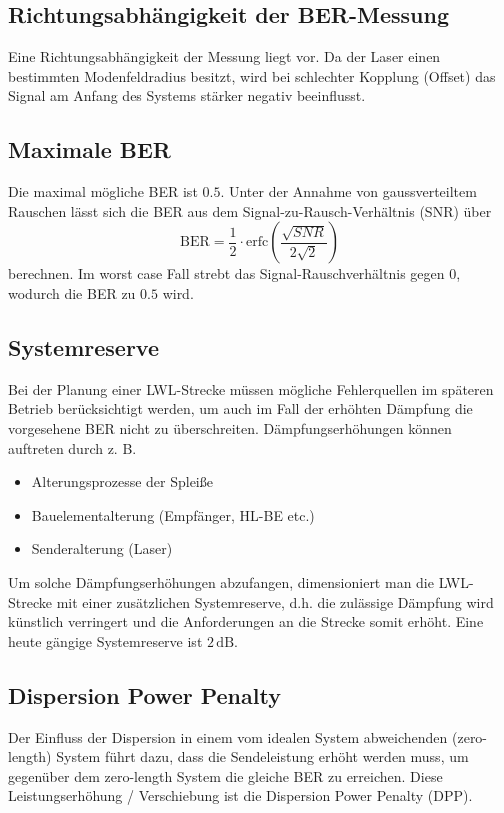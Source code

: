 \documentclass[11pt, a4paper]{article}
\begin{document}
\subsection{Richtungsabhängigkeit der BER-Messung}
Eine Richtungsabhängigkeit der Messung liegt vor. Da der Laser einen
bestimmten Modenfeldradius besitzt, wird bei schlechter Kopplung (Offset)
das Signal am Anfang des Systems stärker negativ beeinflusst.

\subsection{Maximale BER}
Die maximal mögliche BER ist $0.5$.
Unter der Annahme von gaussverteiltem Rauschen lässt sich die
BER aus dem Signal-zu-Rausch-Verhältnis (SNR) über
\[\text{BER} = \frac{1}{2} \cdot \text{erfc}(\frac{\sqrt{SNR}}{2\sqrt{2}})\]
berechnen. Im worst case Fall strebt das Signal-Rauschverhältnis gegen 0,
wodurch die BER zu $0.5$ wird.

\subsection{Systemreserve}
Bei der Planung einer LWL-Strecke müssen mögliche Fehlerquellen im späteren
Betrieb berücksichtigt werden, um auch im Fall der erhöhten Dämpfung die
vorgesehene BER nicht zu überschreiten. Dämpfungserhöhungen können auftreten
durch z. B.
\begin{itemize}
  \item Alterungsprozesse der Spleiße
  \item Bauelementalterung (Empfänger, HL-BE etc.)
  \item Senderalterung (Laser)
\end{itemize}

Um solche Dämpfungserhöhungen abzufangen, dimensioniert man die LWL-Strecke mit
einer zusätzlichen Systemreserve, d.h. die zulässige Dämpfung wird künstlich
verringert und die Anforderungen an die Strecke somit erhöht. Eine heute gängige
Systemreserve ist $2 \, \si{\deci\bel}$.

\subsection{Dispersion Power Penalty}
Der Einfluss der Dispersion in einem vom idealen System abweichenden (zero-
length) System führt dazu, dass die Sendeleistung erhöht werden muss, um
gegenüber dem zero-length System die gleiche BER zu erreichen. Diese
Leistungserhöhung / Verschiebung ist die Dispersion Power Penalty (DPP).
\end{document}
